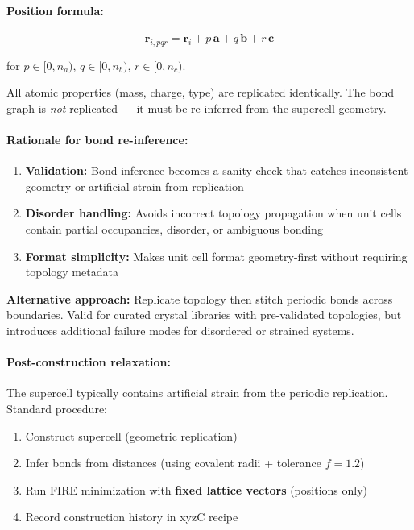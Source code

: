 \documentclass[11pt]{article}
\begin{document}
\paragraph{Position formula:}
\begin{equation}
\mathbf{r}_{i,pqr} = \mathbf{r}_i + p\,\mathbf{a} + q\,\mathbf{b} + r\,\mathbf{c}
\end{equation}

for $p \in [0, n_a)$, $q \in [0, n_b)$, $r \in [0, n_c)$.

All atomic properties (mass, charge, type) are replicated identically. The bond graph is \textit{not} replicated — it must be re-inferred from the supercell geometry.

\paragraph{Rationale for bond re-inference:}

\begin{enumerate}
\item \textbf{Validation:} Bond inference becomes a sanity check that catches inconsistent geometry or artificial strain from replication
\item \textbf{Disorder handling:} Avoids incorrect topology propagation when unit cells contain partial occupancies, disorder, or ambiguous bonding
\item \textbf{Format simplicity:} Makes unit cell format geometry-first without requiring topology metadata
\end{enumerate}

\textbf{Alternative approach:} Replicate topology then stitch periodic bonds across boundaries. Valid for curated crystal libraries with pre-validated topologies, but introduces additional failure modes for disordered or strained systems.

\paragraph{Post-construction relaxation:}

The supercell typically contains artificial strain from the periodic replication. Standard procedure:

\begin{enumerate}
\item Construct supercell (geometric replication)
\item Infer bonds from distances (using covalent radii + tolerance $f=1.2$)
\item Run FIRE minimization with \textbf{fixed lattice vectors} (positions only)
\item Record construction history in xyzC recipe
\end{enumerate}
\end{document}

